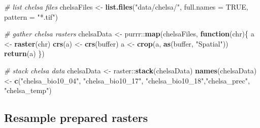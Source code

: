 \documentclass[]{article}
\newenvironment{Shaded}{}{}
\newcommand{\CommentTok}[1]{\textcolor[rgb]{0.38,0.63,0.69}{\textit{#1}}}
\newcommand{\ControlFlowTok}[1]{\textcolor[rgb]{0.00,0.44,0.13}{\textbf{#1}}}
\newcommand{\DataTypeTok}[1]{\textcolor[rgb]{0.56,0.13,0.00}{#1}}
\newcommand{\DecValTok}[1]{\textcolor[rgb]{0.25,0.63,0.44}{#1}}
\newcommand{\KeywordTok}[1]{\textcolor[rgb]{0.00,0.44,0.13}{\textbf{#1}}}
\newcommand{\NormalTok}[1]{#1}
\newcommand{\OperatorTok}[1]{\textcolor[rgb]{0.40,0.40,0.40}{#1}}
\newcommand{\OtherTok}[1]{\textcolor[rgb]{0.00,0.44,0.13}{#1}}
\newcommand{\StringTok}[1]{\textcolor[rgb]{0.25,0.44,0.63}{#1}}
\begin{document}
\begin{Shaded}
\begin{Highlighting}[]
\CommentTok{# list chelsa files}
\NormalTok{chelsaFiles <-}\StringTok{ }\KeywordTok{list.files}\NormalTok{(}\StringTok{"data/chelsa/"}\NormalTok{, }\DataTypeTok{full.names =} \OtherTok{TRUE}\NormalTok{, }\DataTypeTok{pattern =} \StringTok{"*.tif"}\NormalTok{)}

\CommentTok{# gather chelsa rasters}
\NormalTok{chelsaData <-}\StringTok{ }\NormalTok{purrr}\OperatorTok{::}\KeywordTok{map}\NormalTok{(chelsaFiles, }\ControlFlowTok{function}\NormalTok{(chr)\{}
\NormalTok{  a <-}\StringTok{ }\KeywordTok{raster}\NormalTok{(chr)}
  \KeywordTok{crs}\NormalTok{(a) <-}\StringTok{ }\KeywordTok{crs}\NormalTok{(buffer)}
\NormalTok{  a <-}\StringTok{ }\KeywordTok{crop}\NormalTok{(a, }\KeywordTok{as}\NormalTok{(buffer, }\StringTok{"Spatial"}\NormalTok{))}
  \KeywordTok{return}\NormalTok{(a)}
\NormalTok{\})}

\CommentTok{# stack chelsa data}
\NormalTok{chelsaData <-}\StringTok{ }\NormalTok{raster}\OperatorTok{::}\KeywordTok{stack}\NormalTok{(chelsaData)}
\KeywordTok{names}\NormalTok{(chelsaData) <-}\StringTok{ }\KeywordTok{c}\NormalTok{(}\StringTok{"chelsa_bio10_04"}\NormalTok{, }\StringTok{"chelsa_bio10_17"}\NormalTok{, }\StringTok{"chelsa_bio10_18"}\NormalTok{,}\StringTok{"chelsa_prec"}\NormalTok{, }\StringTok{"chelsa_temp"}\NormalTok{)}
\end{Highlighting}
\end{Shaded}

\hypertarget{resample-prepared-rasters}{%
\subsection{Resample prepared rasters}\label{resample-prepared-rasters}}

\begin{Shaded}
\end{Shaded}
\end{document}
